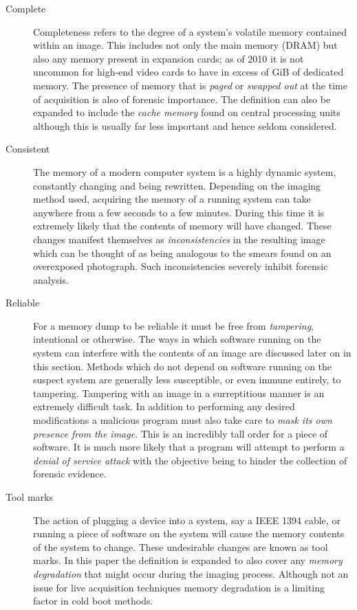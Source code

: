 \documentclass[numbers=noenddot,      %
               abstract,              %
               captions=tableheading, %
               DIV=8]                 %
              {scrartcl}
\begin{document}
\begin{description}
\item [Complete] Completeness refers to the degree of a system's
  volatile memory contained within an image. This includes not only the
  main memory (DRAM) but also any memory present in expansion cards; as
  of 2010 it is not uncommon for high-end video cards to have in excess
  of \unit[1]{GiB} of dedicated memory. The presence of memory that is
  \emph{paged} or \emph{swapped out} at the time of acquisition is also
  of forensic importance. The definition can also be expanded to include
  the \emph{cache memory} found on central processing units although
  this is usually far less important and hence seldom considered.
\item [Consistent] The memory of a modern computer system is a highly
  dynamic system, constantly changing and being rewritten. Depending on
  the imaging method used, acquiring the memory of a running system can
  take anywhere from a few seconds to a few minutes. During this time it
  is extremely likely that the contents of memory will have
  changed. These changes manifest themselves as \emph{inconsistencies}
  in the resulting image which can be thought of as being analogous to
  the smears found on an overexposed photograph. Such inconsistencies
  severely inhibit forensic analysis.
\item [Reliable] For a memory dump to be reliable it must be free from
  \emph{tampering}, intentional or otherwise. The ways in which software
  running on the system can interfere with the contents of an image are
  discussed later on in this section. Methods which do not depend on
  software running on the suspect system are generally less susceptible,
  or even immune entirely, to tampering. Tampering with an image in a
  surreptitious manner is an extremely difficult task. In addition to
  performing any desired modifications a malicious program must also
  take care to \emph{mask its own presence from the image}. This is an
  incredibly tall order for a piece of software. It is much more likely
  that a program will attempt to perform a \emph{denial of service
    attack} with the objective being to hinder the collection of
  forensic evidence.
\item [Tool marks] The action of plugging a device into a system, say a
  IEEE 1394 cable, or running a piece of software on the system will
  cause the memory contents of the system to change. These undesirable
  changes are known as tool marks. In this paper the definition is
  expanded to also cover any \emph{memory degradation} that might occur
  during the imaging process. Although not an issue for live acquisition
  techniques memory degradation is a limiting factor in cold boot
  methods.
\end{description}
\end{document}
